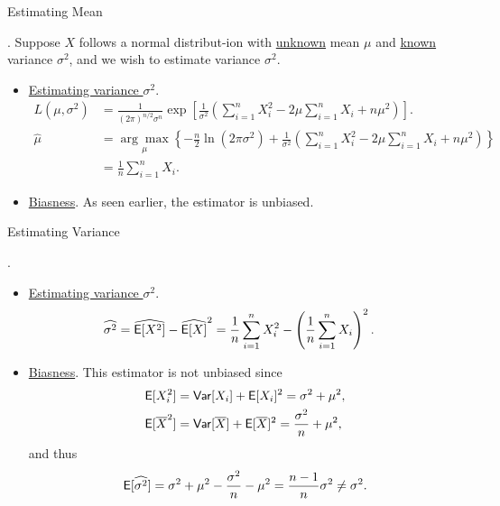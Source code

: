 \begin{frame}{Estimating Mean}

\justifying
{}. Suppose $X$ follows a normal distribut-ion with \underline{unknown} mean $\mu$ and \underline{known} variance $\sigma^2$, and we wish to estimate variance $\sigma^2$.
\begin{itemize}
	\item \underline{Estimating variance $\sigma^2$}. 
	\footnotesize
	\begin{align*}
	L(\mu, \sigma^2) & =  \frac{1}{(2\pi)^{n/2}\sigma^n}\exp\left[\frac{1}{\sigma^2}\left(\sum_{i=1}^n X_i^2 - 2\mu\sum_{i=1}^n X_i + n\mu^2 \right) \right]. \\
	\widehat{\mu} & = \underset{\mu}{\arg\max}\left\{-\frac{n}{2}\ln(2\pi\sigma^2) + \frac{1}{\sigma^2}\left(\sum_{i=1}^n X_i^2 - 2\mu\sum_{i=1}^n X_i + n\mu^2 \right) \right\} \\
	& = \frac{1}{n}\sum_{i=1}^n X_i.
	\end{align*}
	\normalsize
	\item \underline{Biasness}. As seen earlier, the estimator is unbiased.
\end{itemize}

\end{frame}


\begin{frame}{Estimating Variance}

.
\begin{itemize}
	\item \underline{Estimating variance $\sigma^2$}.
	\begin{align*}
	\widehat{\sigma^2} & = \widehat{\mathsf{E}[X^2]} - \widehat{\mathsf{E}[X]}^2 = \frac{1}{n}\sum_{i=1}^n X_i^2 - \left(\frac{1}{n} \sum_{i=1}^n X_i \right)^2.
	\end{align*}
	\item \underline{Biasness}. This estimator is not unbiased since
	\begin{align*}
	\mathsf{E}[X_i^2] & = \mathsf{Var}[X_i] + \mathsf{E}[X_i]^2 = \sigma^2 + \mu^2, \\
	\mathsf{E}[\overline{X}^2] & = \mathsf{Var}[\overline{X}] + \mathsf{E}[\overline{X}]^2 = \frac{\sigma^2}{n} + \mu^2,
	\end{align*}
	and thus
	\begin{align*}
	\mathsf{E}[\widehat{\sigma^2}] = \sigma^2 + \mu^2 - \frac{\sigma^2}{n} - \mu^2 = \frac{n-1}{n}\sigma^2 \neq \sigma^2.
	\end{align*}
\end{itemize}

\end{frame}

